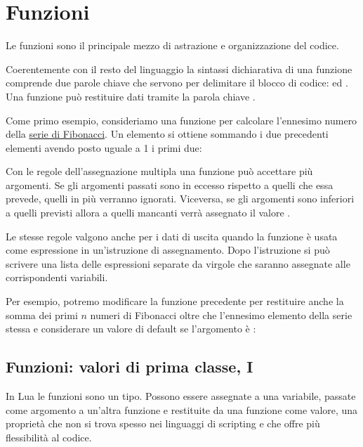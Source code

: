 
\chapter{Funzioni}
\label{chFondFunzioni}

Le funzioni sono il principale mezzo di astrazione e organizzazione del codice.

Coerentemente con il resto del linguaggio la sintassi dichiarativa di una
funzione comprende due parole chiave che servono per delimitare il blocco di
codice:  ed . Una funzione può restituire dati tramite la
parola chiave .

Come primo esempio, consideriamo una funzione per calcolare l'ennesimo numero
della \href{http://it.wikipedia.org/wiki/Successione_di_Fibonacci}{serie di
Fibonacci}. Un elemento si ottiene sommando i due precedenti elementi avendo
posto uguale a 1 i primi due:

Con le regole dell'assegnazione multipla una funzione può accettare più
argomenti. Se gli argomenti passati sono in eccesso rispetto a quelli che essa
prevede, quelli in più verranno ignorati. Viceversa, se gli argomenti sono
inferiori a quelli previsti allora a quelli mancanti verrà assegnato il valore
.

Le stesse regole valgono anche per i dati di uscita quando la funzione è usata
come espressione in un'istruzione di assegnamento. Dopo l'istruzione
 si può scrivere una lista delle espressioni separate
da virgole che saranno assegnate alle corrispondenti variabili.

Per esempio, potremo modificare la funzione precedente per restituire anche la
somma dei primi \( n \) numeri di Fibonacci oltre che l'ennesimo elemento della
serie stessa e considerare un valore di default se l'argomento è :


\section{Funzioni: valori di prima classe, I}

In Lua le funzioni sono un tipo. Possono essere assegnate a una variabile,
passate come argomento a un'altra funzione e restituite da una funzione come
valore, una proprietà che non si trova spesso nei linguaggi di scripting e che
offre più flessibilità al codice.

